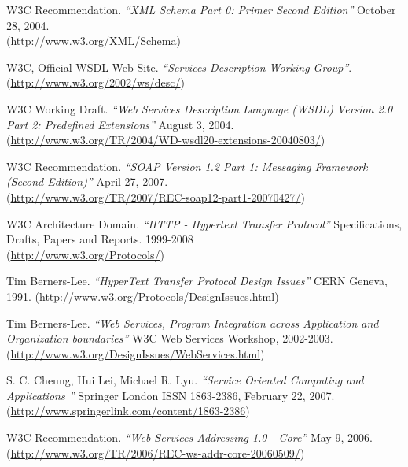 \begin{thebibliography}{99}
 W3C Recommendation. \emph{``XML Schema Part 0: Primer
Second Edition''} October 28, 2004.\\ 
(\href{http://www.w3.org/XML/Schema}{http://www.w3.org/XML/Schema})

 W3C, Official WSDL Web Site. \emph{``Services Description Working
Group''}. \\
(\href{http://www.w3.org/2002/ws/desc/}{http://www.w3.org/2002/ws/desc/})

 W3C Working Draft. \emph{``Web Services Description
Language (WSDL) Version 2.0 Part 2: Predefined Extensions''} August 3, 2004. \\
(\href{http://www.w3.org/TR/2004/WD-wsdl20-extensions-20040803/}{http://www.w3.org/TR/2004/WD-wsdl20-extensions-20040803/})

 W3C Recommendation. \emph{``SOAP Version 1.2 Part 1: Messaging
Framework (Second Edition)''} April 27, 2007. \\
(\href{http://www.w3.org/TR/2007/REC-soap12-part1-20070427/}{http://www.w3.org/TR/2007/REC-soap12-part1-20070427/})

 W3C Architecture Domain. \emph{``HTTP - Hypertext Transfer
Protocol''} Specifications, Drafts, Papers and Reports. 1999-2008\\
(\href{http://www.w3.org/Protocols/}{http://www.w3.org/Protocols/})

 Tim Berners-Lee. \emph{``HyperText Transfer Protocol Design
Issues''} CERN Geneva, 1991. 
(\href{http://www.w3.org/Protocols/DesignIssues.html}{http://www.w3.org/Protocols/DesignIssues.html})

 Tim Berners-Lee. \emph{``Web Services, Program Integration
across Application and Organization boundaries''}  W3C Web Services
Workshop, 2002-2003.
(\href{http://www.w3.org/DesignIssues/WebServices.html}{http://www.w3.org/DesignIssues/WebServices.html})

 S. C. Cheung, Hui Lei, Michael R. Lyu. \emph{``Service Oriented
Computing and Applications ''} Springer London ISSN 1863-2386, February 22,
2007.  
(\href{http://www.springerlink.com/content/1863-2386}{http://www.springerlink.com/content/1863-2386})

  W3C Recommendation. \emph{``Web Services Addressing 1.0
- Core''} May 9, 2006. \\
(\href{http://www.w3.org/TR/2006/REC-ws-addr-core-20060509/}{http://www.w3.org/TR/2006/REC-ws-addr-core-20060509/})


\end{thebibliography}

